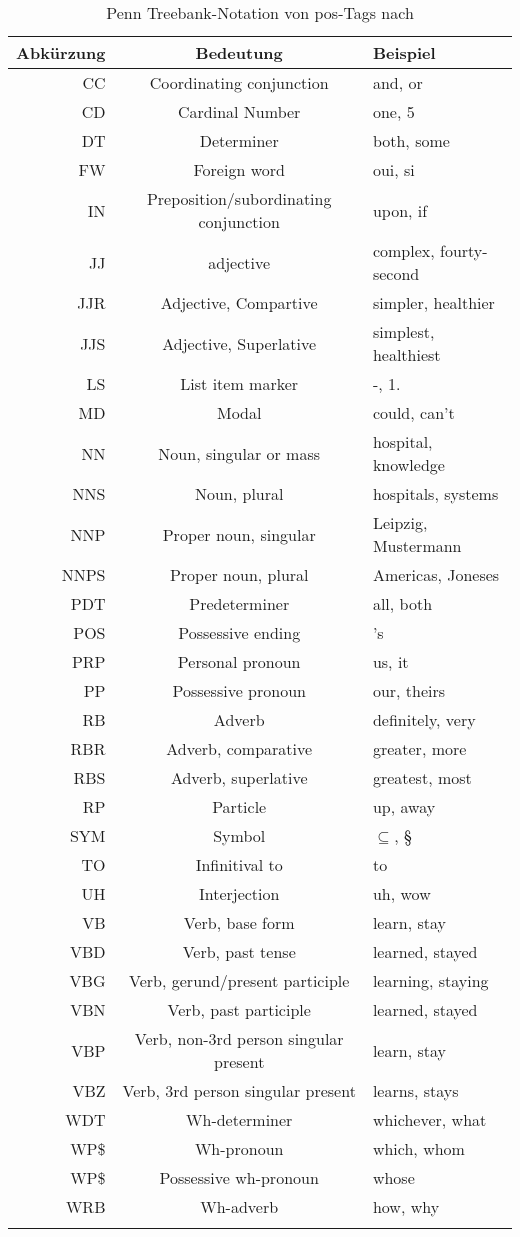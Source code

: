 \begin{longtable}{r c l}
  \toprule
  Abkürzung & Bedeutung & Beispiel \\
  \midrule
  \endhead
  CC & Coordinating conjunction & and, or \\
  CD & Cardinal Number & one, 5 \\
  DT & Determiner & both, some \\
  FW & Foreign word & oui, si \\
  IN & Preposition/subordinating conjunction & upon, if \\
  JJ & adjective & complex, fourty-second \\
  JJR & Adjective, Compartive & simpler, healthier \\
  JJS & Adjective, Superlative &  simplest, healthiest \\
  LS & List item marker & -, 1. \\
  MD & Modal & could, can't \\
  NN & Noun, singular or mass & hospital, knowledge \\
  NNS & Noun, plural & hospitals, systems \\
  NNP & Proper noun, singular & Leipzig, Mustermann \\
  NNPS & Proper noun, plural & Americas, Joneses \\
  PDT & Predeterminer & all, both \\
  POS & Possessive ending & 's \\
  PRP & Personal pronoun & us, it \\
  PP & Possessive pronoun & our, theirs \\
  RB & Adverb & definitely, very \\
  RBR & Adverb, comparative & greater, more \\
  RBS & Adverb, superlative & greatest, most \\
  RP & Particle & up, away \\
  SYM & Symbol & $\subseteq$, § \\
  TO & Infinitival to & to \\
  UH & Interjection & uh, wow \\
  VB & Verb, base form & learn, stay \\
  VBD & Verb, past tense & learned, stayed \\
  VBG & Verb, gerund/present participle & learning, staying \\
  VBN & Verb, past participle & learned, stayed \\
  VBP & Verb, non-3rd person singular present & learn, stay \\
  VBZ & Verb, 3rd person singular present & learns, stays \\
  WDT & Wh-determiner & whichever, what \\
  WP\$ & Wh-pronoun & which, whom \\
  WP\$ & Possessive wh-pronoun & whose \\
  WRB & Wh-adverb & how, why \\
  \bottomrule
  \caption[Penn Treebank-Notation von POS-Tags]{Penn Treebank-Notation von \acs{pos}-Tags nach \citet{penntreebankpos}}
  \label{tab:penntreebankpos}
\end{longtable}
